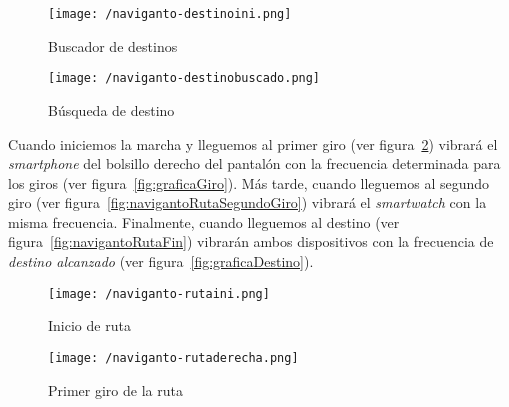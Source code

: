 \begin{figure}[!h]
  \begin{minipage}[b]{0.5\linewidth}
    \begin{center}
      \texttt{[image: /naviganto-destinoini.png]}
      \caption{Buscador de destinos}
      \label{fig:navigantoDestinoIni}
    \end{center}
  \end{minipage}
  \begin{minipage}[b]{0.5\linewidth}
    \begin{center}
      \texttt{[image: /naviganto-destinobuscado.png]}
      \caption{Búsqueda de destino}
      \label{fig:navigantoDestinoBuscado}
    \end{center}
  \end{minipage}
\end{figure}

Cuando iniciemos la marcha y lleguemos al primer giro (ver figura~\ref{fig:navigantoRutaPrimerGiro})
vibrará el \emph{smartphone} del bolsillo derecho del pantalón con la frecuencia determinada para
los giros (ver figura~\ref{fig:graficaGiro}). Más tarde, cuando lleguemos al segundo giro (ver
figura~\ref{fig:navigantoRutaSegundoGiro}) vibrará el \emph{smartwatch} con la misma
frecuencia. Finalmente, cuando lleguemos al destino (ver figura~\ref{fig:navigantoRutaFin}) vibrarán
ambos dispositivos con la frecuencia de \emph{destino alcanzado} (ver
figura~\ref{fig:graficaDestino}).

\begin{figure}[!h]
  \begin{minipage}[b]{0.5\linewidth}
    \begin{center}
      \texttt{[image: /naviganto-rutaini.png]}
      \caption{Inicio de ruta}
      \label{fig:navigantoRutaIni}
    \end{center}
  \end{minipage}
  \begin{minipage}[b]{0.5\linewidth}
    \begin{center}
      \texttt{[image: /naviganto-rutaderecha.png]}
      \caption{Primer giro de la ruta}
      \label{fig:navigantoRutaPrimerGiro}
    \end{center}
  \end{minipage}
\end{figure}

